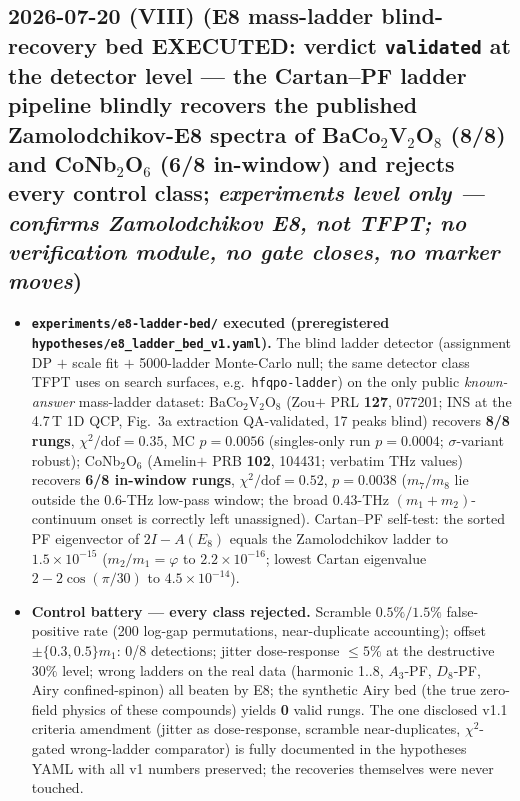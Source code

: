 \subsection*{2026-07-20 (VIII) (E8 mass-ladder blind-recovery bed EXECUTED: verdict \texttt{validated} at the detector level --- the Cartan--PF ladder pipeline blindly recovers the published Zamolodchikov-E8 spectra of BaCo$_2$V$_2$O$_8$ (8/8) and CoNb$_2$O$_6$ (6/8 in-window) and rejects every control class; \emph{experiments level only --- confirms Zamolodchikov E8, not TFPT; no verification module, no gate closes, no marker moves})}
\begin{itemize}[leftmargin=1.5em]
\item \textbf{\texttt{experiments/e8-ladder-bed/} executed (preregistered \texttt{hypotheses/e8\_ladder\_bed\_v1.yaml}).}
The blind ladder detector (assignment DP $+$ scale fit $+$ 5000-ladder Monte-Carlo null; the same detector
class TFPT uses on search surfaces, e.g.\ \texttt{hfqpo-ladder}) on the only public \emph{known-answer}
mass-ladder dataset: BaCo$_2$V$_2$O$_8$ (Zou$+$ PRL \textbf{127}, 077201; INS at the 4.7\,T 1D QCP, Fig.~3a
extraction QA-validated, 17 peaks blind) recovers \textbf{8/8 rungs}, $\chi^2/\mathrm{dof}=0.35$, MC
$p=0.0056$ (singles-only run $p=0.0004$; $\sigma$-variant robust); CoNb$_2$O$_6$ (Amelin$+$ PRB
\textbf{102}, 104431; verbatim THz values) recovers \textbf{6/8 in-window rungs},
$\chi^2/\mathrm{dof}=0.52$, $p=0.0038$ ($m_7/m_8$ lie outside the 0.6-THz low-pass window; the broad
0.43-THz $(m_1{+}m_2)$-continuum onset is correctly left unassigned). Cartan--PF self-test: the sorted PF
eigenvector of $2I-A(E_8)$ equals the Zamolodchikov ladder to $1.5\times10^{-15}$ ($m_2/m_1=\varphi$ to
$2.2\times10^{-16}$; lowest Cartan eigenvalue $2-2\cos(\pi/30)$ to $4.5\times10^{-14}$).
\item \textbf{Control battery --- every class rejected.} Scramble $0.5\%/1.5\%$ false-positive rate
(200 log-gap permutations, near-duplicate accounting); offset $\pm\{0.3,0.5\}m_1$: 0/8 detections; jitter
dose-response $\le5\%$ at the destructive $30\%$ level; wrong ladders on the real data (harmonic 1..8,
$A_3$-PF, $D_8$-PF, Airy confined-spinon) all beaten by E8; the synthetic Airy bed (the true zero-field
physics of these compounds) yields \textbf{0} valid rungs. The one disclosed v1.1 criteria amendment
(jitter as dose-response, scramble near-duplicates, $\chi^2$-gated wrong-ladder comparator) is fully
documented in the hypotheses YAML with all v1 numbers preserved; the recoveries themselves were never touched.

\end{itemize}
